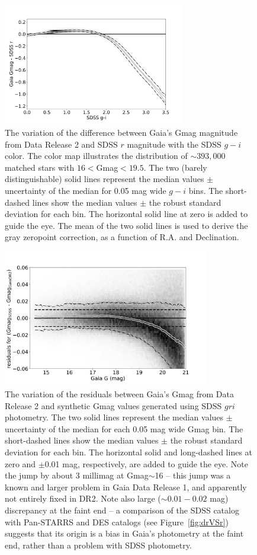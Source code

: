 \begin{figure}
  \centering\includegraphics[width=8cm]{figures/GrVSgi.png} 
\caption{The variation of the difference between Gaia's Gmag magnitude from Data Release 2
and SDSS $r$ magnitude with the SDSS $g-i$ color.
The  color map illustrates the distribution of $\sim 393,000$ matched stars with 
$16<$Gmag$<19.5$. The two (barely distinguishable) solid lines represent the median 
values $\pm$ uncertainty of the median for 0.05 mag wide $g-i$ bins. The short-dashed 
lines show the median values $\pm$ the robust standard deviation for 
each bin. The horizontal solid line at zero is added to guide the eye. The mean of 
the two solid lines is used to derive the gray zeropoint correction, as a function of R.A.
and Declination.}
\label{fig:GrVSgi}
\end{figure}


\begin{figure}
    \centering\includegraphics[width=9cm]{figures/GmagCorrectionTest_Gmag_Hess.png} 
\caption{The variation of the residuals between Gaia's Gmag from Data Release 2
and synthetic Gmag values generated using SDSS $gri$ photometry. The two solid 
lines represent the median values $\pm$ uncertainty of the median for each
0.05 mag wide Gmag bin. The short-dashed lines show the median values $\pm$ 
the robust standard deviation for each bin. The horizontal solid and long-dashed 
lines at zero and $\pm$0.01 mag, respectively, are added to guide the eye.
Note the jump by about 3 millimag at Gmag$\sim$16 -- this jump was a known and 
larger problem in Gaia Data Release 1, and apparently not entirely fixed in DR2. 
Note also large ($\sim0.01-0.02$ mag) discrepancy at the faint end -- a comparison 
of the SDSS catalog with Pan-STARRS and DES catalogs (see Figure~\ref{fig:drVSr}) 
suggests that its origin is a bias in Gaia's photometry at the faint end, rather than 
a problem with SDSS photometry.}
\label{fig:gaiaJump}
\end{figure}


